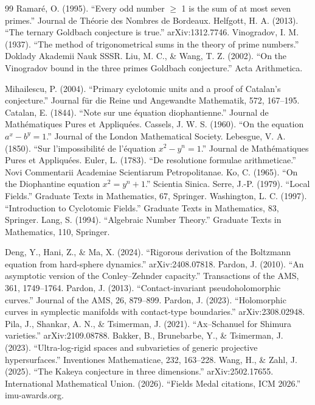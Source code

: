 \begin{thebibliography}{99}
 Ramar\'e, O. (1995). ``Every odd number $\geq$ 1 is the sum of at most seven primes.'' Journal de Th\'eorie des Nombres de Bordeaux.
 Helfgott, H. A. (2013). ``The ternary Goldbach conjecture is true.'' arXiv:1312.7746.
 Vinogradov, I. M. (1937). ``The method of trigonometrical sums in the theory of prime numbers.'' Doklady Akademii Nauk SSSR.
 Liu, M. C., \& Wang, T. Z. (2002). ``On the Vinogradov bound in the three primes Goldbach conjecture.'' Acta Arithmetica.

 Mihailescu, P. (2004). ``Primary cyclotomic units and a proof of Catalan's conjecture.'' Journal f\"ur die Reine und Angewandte Mathematik, 572, 167--195.
 Catalan, E. (1844). ``Note sur une \'equation diophantienne.'' Journal de Math\'ematiques Pures et Appliqu\'ees.
 Cassels, J. W. S. (1960). ``On the equation $a^x - b^y = 1$.'' Journal of the London Mathematical Society.
 Lebesgue, V. A. (1850). ``Sur l'impossibilit\'e de l'\'equation $x^2 - y^n = 1$.'' Journal de Math\'ematiques Pures et Appliqu\'ees.
 Euler, L. (1783). ``De resolutione formulae arithmeticae.'' Novi Commentarii Academiae Scientiarum Petropolitanae.
 Ko, C. (1965). ``On the Diophantine equation $x^2 = y^n + 1$.'' Scientia Sinica.
 Serre, J.-P. (1979). ``Local Fields.'' Graduate Texts in Mathematics, 67, Springer.
 Washington, L. C. (1997). ``Introduction to Cyclotomic Fields.'' Graduate Texts in Mathematics, 83, Springer.
 Lang, S. (1994). ``Algebraic Number Theory.'' Graduate Texts in Mathematics, 110, Springer.

 Deng, Y., Hani, Z., \& Ma, X. (2024). ``Rigorous derivation of the Boltzmann equation from hard-sphere dynamics.'' arXiv:2408.07818.
 Pardon, J. (2010). ``An asymptotic version of the Conley--Zehnder capacity.'' Transactions of the AMS, 361, 1749--1764.
 Pardon, J. (2013). ``Contact-invariant pseudoholomorphic curves.'' Journal of the AMS, 26, 879--899.
 Pardon, J. (2023). ``Holomorphic curves in symplectic manifolds with contact-type boundaries.'' arXiv:2308.02948.
 Pila, J., Shankar, A. N., \& Tsimerman, J. (2021). ``Ax--Schanuel for Shimura varieties.'' arXiv:2109.08788.
 Bakker, B., Brunebarbe, Y., \& Tsimerman, J. (2023). ``Ultra-log-rigid spaces and subvarieties of generic projective hypersurfaces.'' Inventiones Mathematicae, 232, 163--228.
 Wang, H., \& Zahl, J. (2025). ``The Kakeya conjecture in three dimensions.'' arXiv:2502.17655.
 International Mathematical Union. (2026). ``Fields Medal citations, ICM 2026.'' imu-awards.org.

\end{thebibliography}